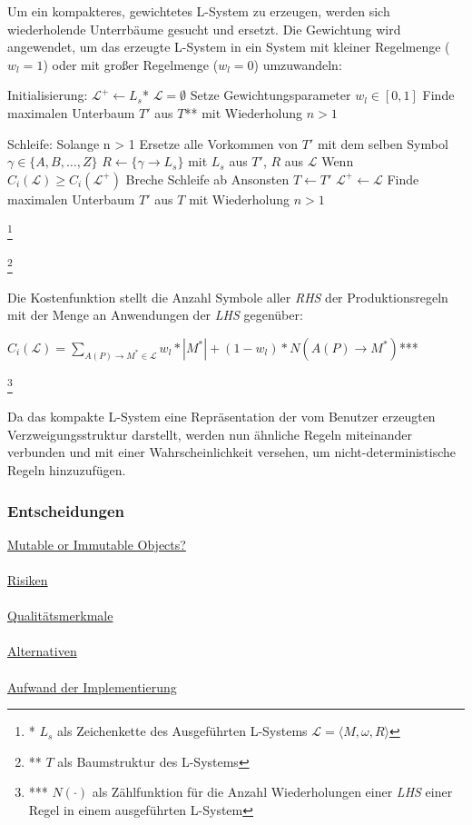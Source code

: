 \documentclass[11pt]{article}
\newcommand\blfootnote[1]{%
\begingroup
\renewcommand\thefootnote{}\footnote{#1}%
\addtocounter{footnote}{-1}%
\endgroup
}
\begin{document}
    Um ein kompakteres, gewichtetes L-System zu erzeugen, werden sich wiederholende Unterrbäume gesucht und ersetzt.
    Die Gewichtung wird angewendet, um das erzeugte L-System in ein System mit kleiner Regelmenge ($w_l=1$) oder mit
    großer Regelmenge ($w_l=0$) umzuwandeln:
    \begin{algorithm}[caption={Erstellen eines kompakten L-Systems mit Gewichtung $w_l$}, label={alg3}]
Initialisierung:
    $\mathcal{L}^+ \leftarrow L_s$*
    $\mathcal{L}=\emptyset$
    Setze Gewichtungsparameter $w_l \in [0,1]$
    Finde maximalen Unterbaum $T'$ aus $T$** mit Wiederholung $n > 1$

Schleife: Solange n > 1
    Ersetze alle Vorkommen von $T'$ mit dem selben Symbol $\gamma \in \{A,B,\dots,Z\}$
    $R \leftarrow \{\gamma \rightarrow L_s\}$ mit $L_s$ aus $T'$, $R$ aus $\mathcal{L}$
    Wenn $C_i(\mathcal{L}) \geq C_i(\mathcal{L}^+)$
        Breche Schleife ab
    Ansonsten
        $T \leftarrow T'$
        $\mathcal{L}^+ \leftarrow \mathcal{L}$
        Finde maximalen Unterbaum $T'$ aus $T$ mit Wiederholung $n > 1$
    \end{algorithm}
    \blfootnote{* $L_s$ als Zeichenkette des Ausgeführten L-Systems $\mathcal{L}=\langle M,\omega,R \rangle$}
    \blfootnote{** $T$ als Baumstruktur des L-Systems}

    Die Kostenfunktion stellt die Anzahl Symbole aller \textit{RHS} der Produktionsregeln mit der Menge an
    Anwendungen der \textit{LHS} gegenüber:
    \begin{algorithm}[caption={Kostenfunktion $C_i$ mit Gewichtung $w_l$}, label={alg3}]
$C_i(\mathcal{L})= \sum\limits_{A(P) \rightarrow M^* \in \mathcal{L}} w_l * |M^*| + (1 - w_l) * N(A(P)\rightarrow
M^*)$***
    \end{algorithm}
    \blfootnote{*** $N(\cdot)$ als Zählfunktion für die Anzahl Wiederholungen einer \textit{LHS} einer Regel in einem
    ausgeführten L-System}

    Da das kompakte L-System eine Repräsentation der vom Benutzer erzeugten Verzweigungsstruktur darstellt, werden
    nun ähnliche Regeln miteinander verbunden und mit einer Wahrscheinlichkeit versehen, um nicht-deterministische
    Regeln hinzuzufügen.


    \subsubsection{Entscheidungen}
        \underline{Mutable or Immutable Objects?}\\~\\
        \underline{Risiken}\\~\\
        \underline{Qualitätsmerkmale}\\~\\
        \underline{Alternativen}\\~\\
        \underline{Aufwand der Implementierung}
\end{document}
